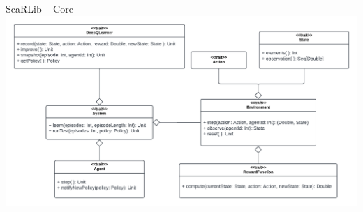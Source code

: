 \documentclass[presentation, 9pt]{beamer}\mode<presentation>{\usetheme{AMSBolognaFC}}
\begin{document}
\begin{frame}{ScaRLib -- Core}
\includegraphics[width=\textwidth]{img/core-architecture.pdf}
\end{frame}
\end{document}
